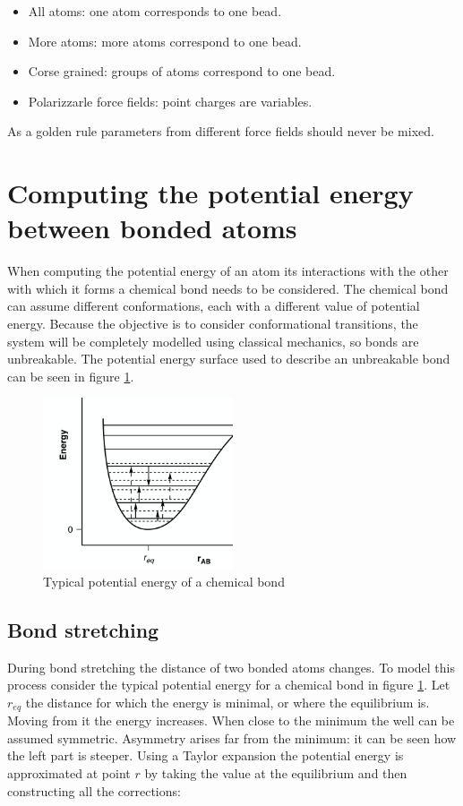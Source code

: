 	\begin{multicols}{2}
		\begin{itemize}
			\item All atoms: one atom corresponds to one bead.
			\item More atoms: more atoms correspond to one bead.
			\item Corse grained: groups of atoms correspond to one bead.
			\item Polarizzarle force fields: point charges are variables.
		\end{itemize}
	\end{multicols}

	As a golden rule parameters from different force fields should never be mixed.


\section{Computing the potential energy between bonded atoms}
When computing the potential energy of an atom its interactions with the other with which it forms a chemical bond needs to be considered.
The chemical bond can assume different conformations, each with a different value of potential energy.
Because the objective is to consider conformational transitions, the system will be completely modelled using classical mechanics, so bonds are unbreakable.
The potential energy surface used to describe an unbreakable bond can be seen in figure \ref{fig:chem-bond}.

\begin{figure}[H]
	\centering
	\includegraphics[width=0.5\textwidth]{chem-bond}
	\caption{Typical potential energy of a chemical bond}
	\label{fig:chem-bond}
\end{figure}

	\subsection{Bond stretching}
	During bond stretching the distance of two bonded atoms changes.
	To model this process consider the typical potential energy for a chemical bond in figure \ref{fig:chem-bond}.
	Let $r_{eq}$ the distance for which the energy is minimal, or where the equilibrium is.
	Moving from it the energy increases.
	When close to the minimum the well can be assumed symmetric.
	Asymmetry arises far from the minimum: it can be seen how the left part is steeper.
	Using a Taylor expansion the potential energy is approximated at point $r$ by taking the value at the equilibrium and then constructing all the corrections:

